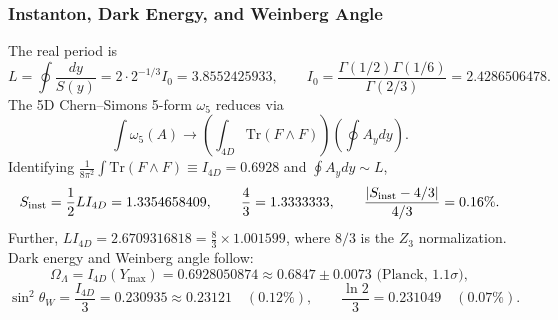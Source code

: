 \documentclass[a4paper,1pt,oneside,openany]{book}
\begin{document}
\subsubsection{Instanton, Dark Energy, and Weinberg Angle}
\label{sssec:instanton}
The real period is
\begin{equation}
L = \oint\frac{dy}{S(y)} = 2 \cdot 2^{-1/3} I_0 = 3.8552425933, \qquad I_0 = \frac{\Gamma(1/2)\Gamma(1/6)}{\Gamma(2/3)} = 2.4286506478.
\end{equation}
The 5D Chern--Simons 5-form \(\omega_5\) reduces via
\begin{equation}
\int \omega_5(A) \to \left(\int_{4D} \mathrm{Tr}(F \wedge F)\right)\left(\oint A_y dy\right).
\end{equation}
Identifying \(\frac{1}{8\pi^2}\int \mathrm{Tr}(F \wedge F) \equiv I_{4D} = 0.6928\) and \(\oint A_y dy \sim L\),
\begin{equation}
S_{\rm inst} = \frac{1}{2} L I_{4D} = 1.3354658409, \qquad \frac{4}{3} = 1.3333333, \qquad \frac{|S_{\rm inst}-4/3|}{4/3} = 0.16\%.
\label{eq:instanton}
\end{equation}
Further, \(L I_{4D} = 2.6709316818 = \frac{8}{3} \times 1.001599\), where \(8/3\) is the \(Z_3\) normalization. Dark energy and Weinberg angle follow:
\begin{equation}
\Omega_\Lambda = I_{4D}(Y_{\max}) = 0.6928050874 \approx 0.6847 \pm 0.0073 \text{ (Planck, }1.1\sigma\text{)},
\end{equation}
\begin{equation}
\sin^2\theta_W = \frac{I_{4D}}{3} = 0.230935 \approx 0.23121 \quad (0.12\%), \qquad \frac{\ln 2}{3} = 0.231049 \quad (0.07\%).
\end{equation}

\end{document}
